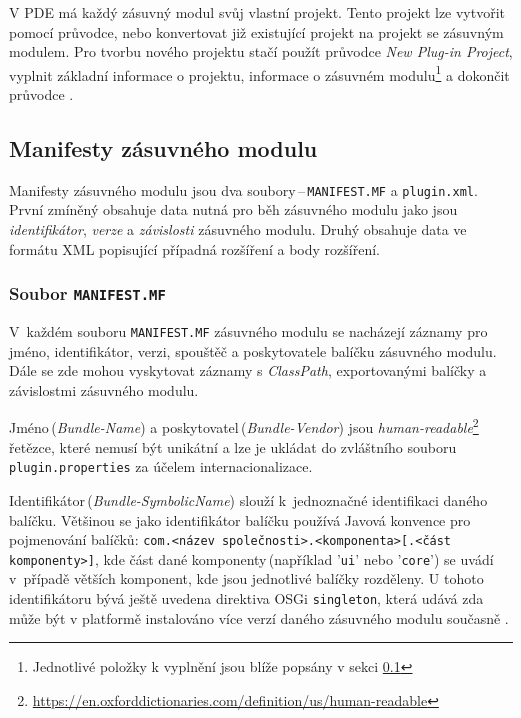     V PDE má každý zásuvný modul svůj vlastní projekt. Tento projekt lze vytvořit pomocí průvodce, nebo konvertovat již existující projekt na projekt se zásuvným modulem. Pro tvorbu nového projektu stačí použít průvodce \emph{New Plug-in Project}, vyplnit základní informace o projektu, informace o zásuvném modulu\footnote{Jednotlivé položky k vyplnění jsou blíže popsány v sekci \ref{section:manifesty_zasuvneho_modulu}} a dokončit průvodce \cite{Blewitt:Eclipse4}.

    \subsection{Manifesty zásuvného modulu}
    \label{section:manifesty_zasuvneho_modulu}
    Manifesty zásuvného modulu jsou dva soubory\,--\,\texttt{MANIFEST.MF} a \texttt{plugin.xml}. První zmíněný obsahuje data nutná pro běh zásuvného modulu jako jsou \emph{identifikátor}, \emph{verze} a \emph{závislosti} zásuvného modulu. Druhý obsahuje data ve formátu XML popisující případná rozšíření a body rozšíření.

      \subsubsection{Soubor \texttt{MANIFEST.MF}}
      V~každém souboru \texttt{MANIFEST.MF} zásuvného modulu se nacházejí záznamy pro jméno, identifikátor, verzi, spouštěč a poskytovatele balíčku zásuvného modulu. Dále se zde mohou vyskytovat záznamy s \emph{ClassPath}, exportovanými balíčky a závislostmi zásuvného modulu.

      Jméno\,(\emph{Bundle-Name}) a poskytovatel\,(\emph{Bundle-Vendor}) jsou \emph{human-readable}\footnote{\url{https://en.oxforddictionaries.com/definition/us/human-readable}} řetězce, které nemusí být unikátní a lze je ukládat do zvláštního souboru \texttt{plugin.properties} za účelem internacionalizace.

      Identifikátor\,(\emph{Bundle-SymbolicName}) slouží k~jednoznačné identifikaci daného balíčku. Většinou se jako identifikátor balíčku používá Javová konvence pro pojmenování balíčků: \texttt{com.<název společnosti>.<komponenta>[.<část komponenty>]}, kde část dané komponenty\,(například '\texttt{ui}' nebo '\texttt{core}') se uvádí v~případě větších komponent, kde jsou jednotlivé balíčky rozděleny. U tohoto identifikátoru bývá ještě uvedena direktiva OSGi \texttt{singleton}, která udává zda může být v platformě instalováno více verzí daného zásuvného modulu současně \cite{Blewitt:Eclipse4}.


